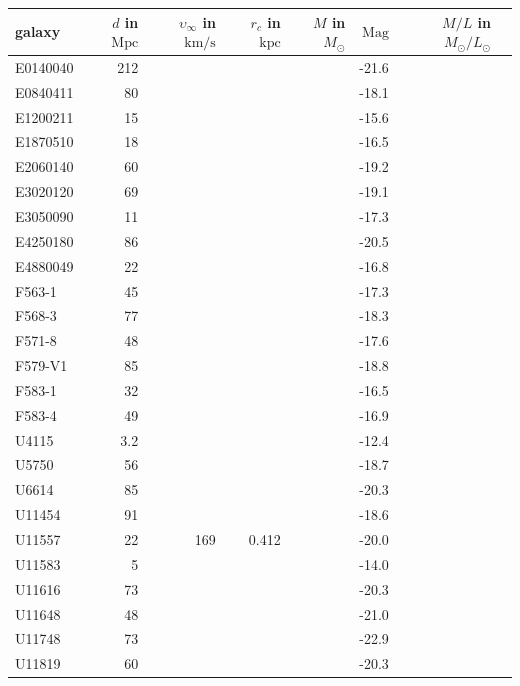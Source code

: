 \documentclass[a4paper,12pt]{article}
\begin{document}
\begin{enumerate}
\begin{table}[h]
\begin{center}
\begin{tabular}{|l|r|r|r|r|r|r|r|}
\hline
galaxy		& $d$ in $\mathrm{Mpc}$	& $\upsilon_\infty$ in $\mathrm{km}/\mathrm{s}$ & $r_c$ in $\mathrm{kpc}$ & $M$ in $M_\odot$ & $\mathrm{Mag}$ & $M/L$ in $M_\odot/L_\odot$\\
\hline
E0140040	& 212	& & & & -21.6 & \\
E0840411	& 80	& & & & -18.1 & \\
E1200211	& 15	& & & & -15.6 & \\
E1870510	& 18	& & & & -16.5 & \\
E2060140	& 60	& & & & -19.2 & \\
E3020120	& 69	& & & & -19.1 & \\
E3050090	& 11	& & & & -17.3 & \\
E4250180	& 86	& & & & -20.5 & \\
E4880049	& 22	& & & & -16.8 & \\
F563-1		& 45	& & & & -17.3 & \\
F568-3		& 77	& & & & -18.3 & \\
F571-8		& 48	& & & & -17.6 & \\
F579-V1		& 85	& & & & -18.8 & \\
F583-1		& 32	& & & & -16.5 & \\
F583-4		& 49	& & & & -16.9 & \\
U4115		& 3.2	& & & & -12.4 & \\
U5750		& 56	& & & & -18.7 & \\
U6614		& 85	& & & & -20.3 & \\
U11454		& 91	& & & & -18.6 & \\
U11557		& 22	& 169 & 0.412 & & -20.0 & \\
U11583		& 5		& & & & -14.0 & \\
U11616		& 73	& & & & -20.3 & \\
U11648		& 48	& & & & -21.0 & \\
U11748		& 73	& & & & -22.9 & \\
U11819		& 60	& & & & -20.3 & \\
\hline
\end{tabular}
\end{center}
\end{table}


\end{enumerate}
\end{document}
